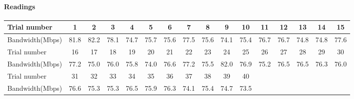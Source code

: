 \documentclass[aps,letterpaper,10pt]{revtex4}
\begin{document}
            \paragraph{Readings}
                \begin{center}
                    \begin{tabular}{ ||l || c | c | c | c | c | c | c | c | c | c | c | c | c | c | c | }
                    \hline
                    Trial number & 1 & 2 & 3 & 4 & 5 & 6 & 7 & 8 & 9 & 10 & 11 & 12 & 13 & 14 & 15 \\ \hline
                    Bandwidth(Mbps) & 81.8 & 82.2 & 78.1 & 74.7 & 75.7 & 75.6 & 77.5 & 75.6 & 74.1 & 75.4 & 76.7 & 76.7 & 74.8 & 74.8 & 77.6\\
                    \hline   
                    \hline
                    Trial number & 16 & 17 & 18 & 19 & 20 & 21 & 22 & 23 & 24 & 25 & 26 & 27 & 28 & 29 & 30 \\ \hline 
                    Bandwidth(Mbps) & 77.2 & 75.0 & 76.0 & 75.8 & 74.0 & 76.6 & 77.2 & 75.5 & 82.0 & 76.9 & 75.2 & 76.5 & 76.5 & 76.3 & 76.0\\     
                    \hline    
                    \hline
                    Trial number & 31 & 32 & 33 & 34 & 35 & 36 & 37 & 38 & 39 & 40 & & & & & \\ \hline
                    Bandwidth(Mbps) & 76.6 & 75.3 & 75.3 & 76.5 & 75.9 & 76.3 & 74.1 & 75.4 & 74.7 & 73.5 & & & & &\\
                    \hline
                    \end{tabular}
                \end{center}
                \vspace{3mm}
\end{document}
